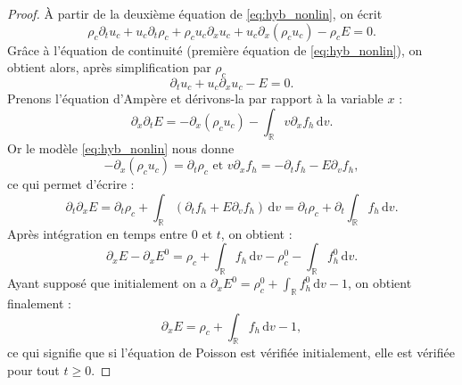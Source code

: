 \begin{proof}
  À partir de la deuxième équation de \eqref{eq:hyb_nonlin}, on écrit 
  $$
    \rho_c \partial_t u_c + u_c\partial_t \rho_c + \rho_c u_c\partial_x u_c + u_c  \partial_x (\rho_c u_c) - \rho_c E=0. 
  $$
  Grâce à l'équation de continuité (première équation de \eqref{eq:hyb_nonlin}), on obtient alors, après simplification par $\rho_c$  
  $$
    \partial_t u_c +  u_c\partial_x u_c - E=0. 
  $$
  Prenons l'équation d'Ampère et dérivons-la par rapport à la variable $x$ :
  $$
    \partial_x\partial_t E = -\partial_x(\rho_cu_c) - \int_{\mathbb{R}} v\partial_x f_h\,\mathrm{d}v.
  $$
  Or le modèle \eqref{eq:hyb_nonlin} nous donne  
  $$
    -\partial_x(\rho_cu_c) = \partial_t\rho_c \mbox{ et } v\partial_xf_h = -\partial_tf_h - E\partial_vf_h, 
  $$ 
  ce qui permet d'écrire :
  $$
    \partial_t\partial_x E = \partial_t\rho_c + \int_{\mathbb{R}} (\partial_tf_h + E\partial_vf_h) \,\mathrm{d}v = \partial_t\rho_c + \partial_t \int_{\mathbb{R}}  f_h  \,\mathrm{d}v .
  $$
  Après intégration en temps entre $0$ et $t$, on obtient :
  $$
    \partial_x E - \partial_xE^0 = \rho_c + \int_{\mathbb{R}} f_h\,\mathrm{d}v - \rho_c^0 - \int_{\mathbb{R}} f_h^0\,\mathrm{d}v.
  $$
  Ayant supposé que initialement on a $\partial_xE^0 = \rho_c^0 + \int_{\mathbb{R}} f_h^0\,\mathrm{d}v -1$, on obtient finalement :
  $$
    \partial_x E = \rho_c + \int_{\mathbb{R}} f_h\,\mathrm{d}v - 1,
  $$
  ce qui signifie que si l'équation de Poisson est vérifiée initialement, elle est vérifiée pour tout $t\geq 0$.
\end{proof}


